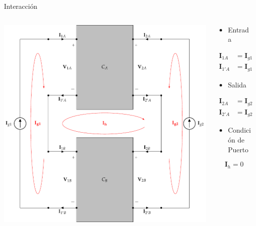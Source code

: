\documentclass[xcolor={usenames,svgnames,dvipsnames}]{beamer}
\begin{document}
\begin{frame}[label={sec:orgbea9c05},plain]{Interacción}
\begin{columns}
\begin{column}{0.9\columnwidth}
\begin{center}
\includegraphics[width=.9\linewidth]{../figs/serie-serie-interaccion.pdf}
\end{center}
\end{column}
\begin{column}{0.3\columnwidth}
\begin{itemize}
\item Entrada
\end{itemize}
\begin{align*}
  \mathbf{I}_{1A} &= \mathbf{I}_{g1}\\
  \mathbf{I}_{1'A} &= \mathbf{I}_{g1} - \mathbf{I}_h
\end{align*}
\begin{itemize}
\item Salida
\end{itemize}
\begin{align*}
  \mathbf{I}_{2A} &= \mathbf{I}_{g2}\\
  \mathbf{I}_{2'A} &= \mathbf{I}_{g2}  + \mathbf{I}_h
\end{align*}
\begin{itemize}
\item Condición de Puerto
\end{itemize}
\[
\boxed{\mathbf{I}_h = 0}
\]
\end{column}
\end{columns}
\end{frame}
\end{document}
